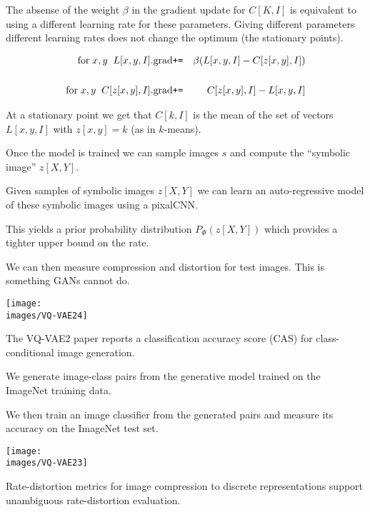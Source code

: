 {\vfill
The absense of the weight $\beta$ in the gradient update for $C[K,I]$ is equivalent to using a different learning rate for these parameters.
Giving different parameters different learning rates does not change the optimum (the stationary points).


\begin{eqnarray*}
\mathrm{for}\;x,y\;\;L[x,y,I].\mathrm{grad} & \mbox{\tt +=} & \beta({L}[x,y,I]- C[z[x,y],I]) \\
\\
\mathrm{for}\;x,y\;\;C[z[x,y],I].\mathrm{grad} & \mbox{\tt +=} & C[z[x,y],I] - L[x,y,I]
\end{eqnarray*}

\vfill
At a stationary point we get that $C[k,I]$ is the mean of the set of vectors $L[x,y,I]$ with $z[x,y] = k$ (as in $k$-means).


Once the model is trained we can sample images $s$ and compute the ``symbolic image'' $z[X,Y]$.

\vfill
Given samples of symbolic images $z[X,Y]$ we can learn an auto-regressive model of these symbolic images using a pixalCNN.

\vfill
This yields a prior probability distribution $P_\Phi(z[X,Y])$ which provides a tighter upper bound on the rate.

\vfill
We can then measure compression and distortion for test images.  This is something GANs cannot do.

\centerline{\texttt{[image: \\images/VQ-VAE24]}}


The VQ-VAE2 paper reports a classification accuracy score (CAS) for class-conditional image generation.

\vfill
We generate image-class pairs from the generative model trained on the ImageNet training data.

\vfill
We then train an image classifier from the generated pairs and measure its accuracy on the ImageNet test set.

\vfill
\centerline{\texttt{[image: \\images/VQ-VAE23]}}


Rate-distortion metrics for image compression to discrete representations support unambiguous rate-distortion evaluation.

}
